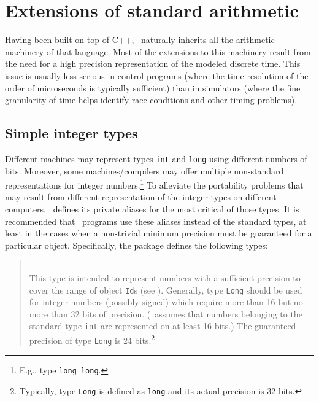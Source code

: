 \section {Extensions of standard arithmetic}
\label {rm_mp}

Having been built on top of C++, \smurph\ naturally inherits all the
arithmetic machinery of that language.
Most of the extensions to this machinery result from the need for a
high precision representation of the modeled discrete time.
This issue is usually less serious in control programs (where the time
resolution of the order of microseconds is typically sufficient) than in
simulators (where the fine granularity of time helps identify race conditions
and other timing problems).

\subsection {Simple integer types}
\label {rm_mp_si}

Different machines may represent types {\tt int}
and {\tt long} using different numbers of bits. 
Moreover, some machines/compilers may offer multiple non-standard
representations for integer numbers.\footnote{E.g., type {\tt long~long}.}
To alleviate the portability problems that may result from different representation
of the integer types on different computers,
\smurph\ defines its private aliases for the most critical of those types.
It is recommended that \smurph\ programs use these aliases instead of the
standard types, at least in the cases when a non-trivial minimum precision must be
guaranteed for a particular object.
Specifically, the package defines the following types:
\medskip

\begin{quote}
\noindent{}\\ \hspace{0in}
This type is intended to represent numbers with a sufficient precision to
cover the range of object {\tt Id}s (see ).
Generally, type {\tt Long} should be used for integer numbers (possibly signed)
which require more than 16 but no more than 32 bits of precision.
(\smurph\ assumes that numbers belonging to the standard type {\tt int} are
represented on at least 16 bits.)
The guaranteed precision of type {\tt Long} is 24
bits.\footnote{Typically, type
{\tt Long} is defined as {\tt long} and its actual precision is 32 bits.}
\end{quote}

